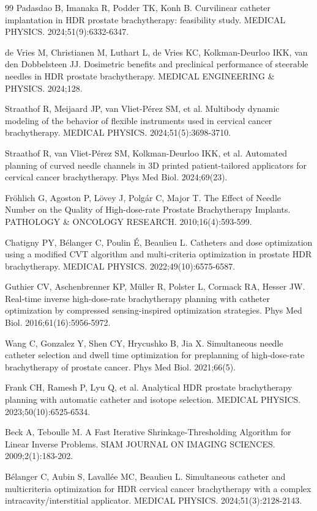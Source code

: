 \documentclass[12pt,twoside,letterpaper]{article}
\newcounter{algorithm}
\begin{document}
\begin{thebibliography}{99}
 Padasdao B, Imanaka R, Podder TK, Konh B. Curvilinear catheter implantation in HDR prostate brachytherapy: feasibility study. MEDICAL PHYSICS. 2024;51(9):6332-6347.

 de Vries M, Christianen M, Luthart L, de Vries KC, Kolkman-Deurloo IKK, van den Dobbelsteen JJ. Dosimetric benefits and preclinical performance of steerable needles in HDR prostate brachytherapy. MEDICAL ENGINEERING \& PHYSICS. 2024;128.

 Straathof R, Meijaard JP, van Vliet-Pérez SM, et al. Multibody dynamic modeling of the behavior of flexible instruments used in cervical cancer brachytherapy. MEDICAL PHYSICS. 2024;51(5):3698-3710.

 Straathof R, van Vliet-Pérez SM, Kolkman-Deurloo IKK, et al. Automated planning of curved needle channels in 3D printed patient-tailored applicators for cervical cancer brachytherapy. Phys Med Biol. 2024;69(23).

 Fröhlich G, Agoston P, Lövey J, Polgár C, Major T. The Effect of Needle Number on the Quality of High-dose-rate Prostate Brachytherapy Implants. PATHOLOGY \& ONCOLOGY RESEARCH. 2010;16(4):593-599.

 Chatigny PY, Bélanger C, Poulin É, Beaulieu L. Catheters and dose optimization using a modified CVT algorithm and multi-criteria optimization in prostate HDR brachytherapy. MEDICAL PHYSICS. 2022;49(10):6575-6587.

 Guthier CV, Aschenbrenner KP, Müller R, Polster L, Cormack RA, Hesser JW. Real-time inverse high-dose-rate brachytherapy planning with catheter optimization by compressed sensing-inspired optimization strategies. Phys Med Biol. 2016;61(16):5956-5972.

 Wang C, Gonzalez Y, Shen CY, Hrycushko B, Jia X. Simultaneous needle catheter selection and dwell time optimization for preplanning of high-dose-rate brachytherapy of prostate cancer. Phys Med Biol. 2021;66(5).

 Frank CH, Ramesh P, Lyu Q, et al. Analytical HDR prostate brachytherapy planning with automatic catheter and isotope selection. MEDICAL PHYSICS. 2023;50(10):6525-6534.

 Beck A, Teboulle M. A Fast Iterative Shrinkage-Thresholding Algorithm for Linear Inverse Problems. SIAM JOURNAL ON IMAGING SCIENCES. 2009;2(1):183-202.

 Bélanger C, Aubin S, Lavallée MC, Beaulieu L. Simultaneous catheter and multicriteria optimization for HDR cervical cancer brachytherapy with a complex intracavity/interstitial applicator. MEDICAL PHYSICS. 2024;51(3):2128-2143.


\end{thebibliography}
\end{document}
